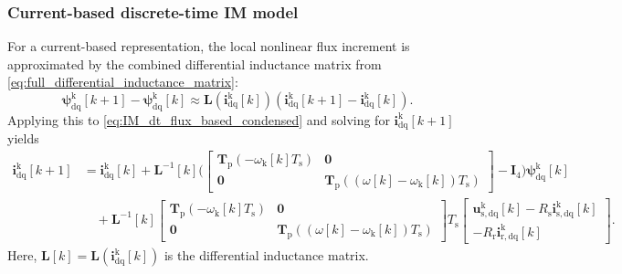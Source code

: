 \begin{frame}
    \frametitle{Current-based discrete-time IM model}
    For a current-based representation, the local nonlinear flux increment is approximated by the combined differential inductance matrix from \eqref{eq:full_differential_inductance_matrix}:
    \begin{equation}
        \bm{\psi}^{\mathrm{k}}_\mathrm{dq}[k+1]-\bm{\psi}^{\mathrm{k}}_\mathrm{dq}[k]
        \approx\bm{L}\!\left(\bm{i}^{\mathrm{k}}_\mathrm{dq}[k]\right)
        \left(\bm{i}^{\mathrm{k}}_\mathrm{dq}[k+1]-\bm{i}^{\mathrm{k}}_\mathrm{dq}[k]\right).
        \label{eq:IM_dt_current_increment}
    \end{equation}\pause%
    Applying this to \eqref{eq:IM_dt_flux_based_condensed} and solving for $\bm{i}^{\mathrm{k}}_\mathrm{dq}[k+1]$ yields
    \begin{equation}
        \begin{split}
            \bm{i}^{\mathrm{k}}_\mathrm{dq}[k+1]
             & =\bm{i}^{\mathrm{k}}_\mathrm{dq}[k]
            +\bm{L}^{-1}[k]\Bigg(\!\left[
                                       \begin{array}{cc}
                                           \bm{T}_\mathrm{p}(-\omega_\mathrm{k}[k]T_\mathrm{s}) & \bm{0}                                                          \\
                                           \bm{0}                                               & \bm{T}_\mathrm{p}((\omega[k]-\omega_\mathrm{k}[k])T_\mathrm{s})
                                       \end{array}\right]-\bm{I}_4\!\Bigg)\bm{\psi}^{\mathrm{k}}_\mathrm{dq}[k] \\
             & \quad+\bm{L}^{-1}[k]\left[
                                       \begin{array}{cc}
                                           \bm{T}_\mathrm{p}(-\omega_\mathrm{k}[k]T_\mathrm{s}) & \bm{0}                                                          \\
                                           \bm{0}                                               & \bm{T}_\mathrm{p}((\omega[k]-\omega_\mathrm{k}[k])T_\mathrm{s})
                                       \end{array}\right]T_\mathrm{s}
            \begin{bmatrix}
                \bm{u}^{\mathrm{k}}_{\mathrm{s,dq}}[k]-R_\mathrm{s}\bm{i}^{\mathrm{k}}_{\mathrm{s,dq}}[k] \\
                -R_\mathrm{r}\bm{i}^{\mathrm{k}}_{\mathrm{r,dq}}[k]
            \end{bmatrix} .
        \end{split}
        \label{eq:IM_dt_current_based_detailed}
    \end{equation}\pause%
    Here, $\bm{L}[k]=\bm{L}(\bm{i}^{\mathrm{k}}_\mathrm{dq}[k])$ is the differential inductance matrix.
\end{frame}


